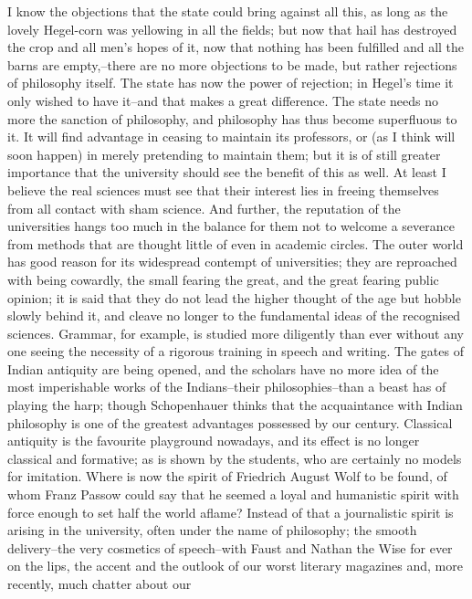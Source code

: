I know the objections that the state could bring against all this, as
long as the lovely Hegel-corn was yellowing in all the fields; but
now that hail has destroyed the crop and all men's hopes of it, now
that nothing has been fulfilled and all the barns are empty,--there
are no more objections to be made, but rather rejections of
philosophy itself. The state has now the power of rejection; in
Hegel's time it only wished to have it--and that makes a great
difference. The state needs no more the sanction of philosophy, and
philosophy has thus become superfluous to it. It will find advantage
in ceasing to maintain its professors, or (as I think will soon
happen) in merely pretending to maintain them; but it is of still
greater importance that the university should see the benefit of this
as well. At least I believe the real sciences must see that their
interest lies in freeing themselves from all contact with sham
science. And further, the reputation of the universities hangs too
much in the balance for them not to welcome a severance from methods
that are thought little of even in academic circles. The outer world
has good reason for its widespread contempt of universities; they are
reproached with being cowardly, the small fearing the great, and the
great fearing public opinion; it is said that they do not lead the
higher thought of the age but hobble slowly behind it, and cleave no
longer to the fundamental ideas of the recognised sciences. Grammar,
for example, is studied more diligently than ever without any one
seeing the necessity of a rigorous training in speech and writing.
The gates of Indian antiquity are being opened, and the scholars have
no more idea of the most imperishable works of the Indians--their
philosophies--than a beast has of playing the harp; though
Schopenhauer thinks that the acquaintance with Indian philosophy is
one of the greatest advantages possessed by our century. Classical
antiquity is the favourite playground nowadays, and its effect is no
longer classical and formative; as is shown by the students, who are
certainly no models for imitation. Where is now the spirit of
Friedrich August Wolf to be found, of whom Franz Passow could say
that he seemed a loyal and humanistic spirit with force enough to set
half the world aflame? Instead of that a journalistic spirit is
arising in the university, often under the name of philosophy; the
smooth delivery--the very cosmetics of speech--with Faust and Nathan
the Wise for ever on the lips, the accent and the outlook of our
worst literary magazines and, more recently, much chatter about our
